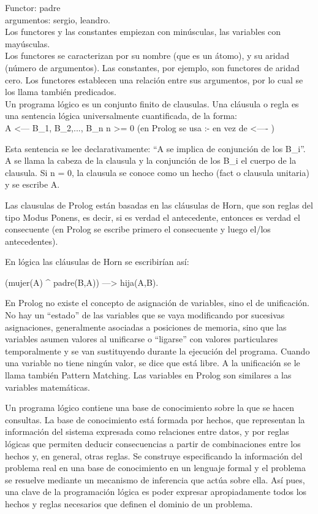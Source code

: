 \documentclass[12pt,titlepage]{report}
\begin{document}
Functor: padre \\
argumentos: sergio, leandro. \\

Los functores y las constantes empiezan con minúsculas, las variables con mayúsculas. \\

Los functores se caracterizan por su nombre (que es un átomo), y su aridad (número de argumentos). Las constantes, por ejemplo, son functores de aridad cero. Los functores establecen una relación entre sus argumentos, por lo cual se los llama también predicados. \\

Un programa lógico es un conjunto finito de clausulas. Una cláusula o regla es una sentencia lógica universalmente cuantificada, de la forma: \\

A <--- B_1, B_2,..., B_n    n >= 0    (en Prolog se usa :- en vez de <---- )

Esta sentencia se lee declarativamente: “A se implica de conjunción de los B_i”. A se llama la cabeza de la clausula y la conjunción de los B_i el cuerpo de la clausula.
Si n = 0, la clausula se conoce como un hecho (fact o clausula unitaria) y se escribe A.

Las clausulas de Prolog están basadas en las cláusulas de Horn, que son reglas del tipo Modus Ponens, es decir, si es verdad el antecedente, entonces es verdad el consecuente (en Prolog se escribe primero el consecuente y luego el/los antecedentes).

En lógica las cláusulas de Horn se escribirían así:

(mujer(A) ^ padre(B,A)) ---> hija(A,B).


En Prolog no existe el concepto de asignación de variables, sino el de unificación. No hay un “estado” de las variables que se vaya modificando por sucesivas asignaciones, generalmente asociadas a posiciones de memoria, sino que las variables asumen valores al unificarse o “ligarse” con valores particulares temporalmente y se van sustituyendo durante la ejecución del programa. Cuando una variable no tiene ningún valor, se dice que está libre. A la unificación se le llama también Pattern Matching.
Las variables en Prolog son similares a las variables matemáticas. 



Un programa lógico contiene una base de conocimiento sobre la que se hacen consultas. La base de conocimiento está formada por hechos, que representan la información del sistema expresada como relaciones entre datos, y por reglas lógicas que permiten deducir consecuencias a partir de combinaciones entre los hechos y, en general, otras reglas. 
Se construye especificando la información del problema real en una base de conocimiento en un lenguaje formal y el problema se resuelve mediante un mecanismo de inferencia que actúa sobre ella. Así pues, una clave de la programación lógica es poder expresar apropiadamente todos los hechos y reglas necesarios que definen el dominio de un problema. 
\end{document}

